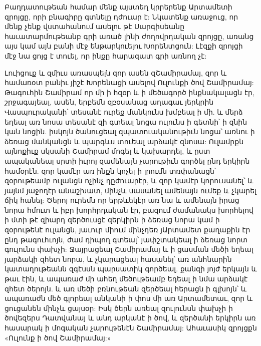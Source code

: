 \documentclass{article}
\begin{document}
{Բաղդատութեան համար մենք այստեղ կրրերենք Արտամետի զրոյցը, որի բնագիրը գտնելը դժուար է: Նկատենք առաջուց, որ մենք չենք վստահանում ասելու թէ Սարգիսեանը հաւատարմութեանբ գրի առած լինի ժողովրդական զրոյցը, առանց այս կամ այն բանի մէջ ենթարկուելու Խորենտցուն: Լէզքի զրոյցի մէջ նա ցոյց է տուել, որ ինքը հարազատ գրի առնող չէ:

Լուիցուք և զմիւս առասպելն զոր ասեն զՇամիրամայ, զոր և համառօտ բանիւ յիշէ Խորենացի ասելով Ուլունքի ծով Շամիրամայ: Թագուհին Շամիրամ որ մի ի հզօր և ի մեծագործ ինքնակալացն էր, շրջագայեալ, ասեն, երբեմն զբօսանաց աղագաւ յերկրին Վասպուրականի՝ տեսանէ ուրեք մանկունս խմբեալ ի մի. և մերձ եղեալ առ նոսա տեսանէ զի գտեալ նոցա ուլունս ի գետնի՝ ի զնին կան նոցին. իսկոյն ծանուցեալ զպատուականութիւն նոցա՝ առնու ի ձեռաց մանկանցն և պարգևս տուեալ արձակէ զնոսա: Ուլամրքն այնոքիւք սկսանի Շամիրամ մոգել և կախարդել, և ըստ ապականեալ սրտի իւրոյ զամենայն չարութիւն գործել ընդ երկիրն համօրէն. զոր կամէր առ ինքն կոչել ի լրումն տռփանացն՝ զօրութեամբ ուլանցն ոչինչ դըժուարէր, և զոր կամէր կորուսանել՝ և յայնմ յաջողէր անաշխատ, մինչև սասանել ամենայն ումեք և չկարել ճիկ հանել: Ծերոյ ուրեմն որ երթևեկէր առ նա և ամենայն իրաց նորա հմուտ և իբր խորհրդական էր, բազում ժամանակս խորհելով ի մտի թէ զիարդ զերծուսցէ զերկիրն ի ձեռաց նորա կամ ի զօրութենէ ուլանցն, յաւուր միում մինչդեռ յԱրտամետ քաղաքին էր ընդ թագուհւոյն, ժամ դիպող գտեալ՝ յափշտակեալ ի ձեռաց նորտ գուլունս փախչի: Ջայրացեալ Շամիրամայ և ի ցասման մեծի եղեալ յարձակի զհետ նորա, և չկարացեալ հասանել՝ առ անհնարին կատաղութեանն զգէսսն պարսատիկ գործեալ. քանզի յոյժ երկայն և թաւ էին, և ապառաժ մի ահեղ մեծութեամբ եդեալ ի նմա արձակէ զհետ ծերոյն. և առ մեծի բռնութեան զերծեալ հերացն ի գլխոյն՝ և ապառաժն մեծ գլորեալ անկանի ի փոս մի առ Արտամետաւ, զոր և ցուցանեն մինչև ցայսօր: Իսկ ծերն առեալ զուլունսն փախչի ի ծովեզերս Դատվանայ և անդ արկանէ ի ծով, և զերծանի երկիրն առ հասարակ ի մոգական չարութենէն Շամիրամայ: Ահաւասիկ զրոյցքն «Ուլունք ի ծով Շամիրամայ:»

}
\end{document}
